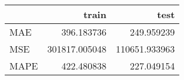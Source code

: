 \begin{tabular}{lrr}
\toprule
{} &          train &           test \\
\midrule
MAE  &     396.183736 &     249.959239 \\
MSE  &  301817.005048 &  110651.933963 \\
MAPE &     422.480838 &     227.049154 \\
\bottomrule
\end{tabular}
